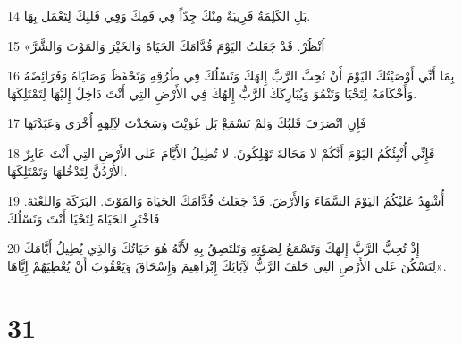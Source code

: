 \par 14 بَلِ الكَلِمَةُ قَرِيبَةٌ مِنْكَ جِدّاً فِي فَمِكَ وَفِي قَلبِكَ لِتَعْمَل بِهَا.
\par 15 «اُنْظُرْ. قَدْ جَعَلتُ اليَوْمَ قُدَّامَكَ الحَيَاةَ وَالخَيْرَ وَالمَوْتَ وَالشَّرَّ
\par 16 بِمَا أَنِّي أَوْصَيْتُكَ اليَوْمَ أَنْ تُحِبَّ الرَّبَّ إِلهَكَ وَتَسْلُكَ فِي طُرُقِهِ وَتَحْفَظَ وَصَايَاهُ وَفَرَائِضَهُ وَأَحْكَامَهُ لِتَحْيَا وَتَنْمُوَ وَيُبَارِكَكَ الرَّبُّ إِلهُكَ فِي الأَرْضِ التِي أَنْتَ دَاخِلٌ إِليْهَا لِتَمْتَلِكَهَا.
\par 17 فَإِنِ انْصَرَفَ قَلبُكَ وَلمْ تَسْمَعْ بَل غَوَيْتَ وَسَجَدْتَ لآِلِهَةٍ أُخْرَى وَعَبَدْتَهَا
\par 18 فَإِنِّي أُنْبِئُكُمُ اليَوْمَ أَنَّكُمْ لا مَحَالةَ تَهْلِكُونَ. لا تُطِيلُ الأَيَّامَ عَلى الأَرْضِ التِي أَنْتَ عَابِرٌ الأُرْدُنَّ لِتَدْخُلهَا وَتَمْتَلِكَهَا.
\par 19 أُشْهِدُ عَليْكُمُ اليَوْمَ السَّمَاءَ وَالأَرْضَ. قَدْ جَعَلتُ قُدَّامَكَ الحَيَاةَ وَالمَوْتَ. البَرَكَةَ وَاللعْنَةَ. فَاخْتَرِ الحَيَاةَ لِتَحْيَا أَنْتَ وَنَسْلُكَ
\par 20 إِذْ تُحِبُّ الرَّبَّ إِلهَكَ وَتَسْمَعُ لِصَوْتِهِ وَتَلتَصِقُ بِهِ لأَنَّهُ هُوَ حَيَاتُكَ وَالذِي يُطِيلُ أَيَّامَكَ لِتَسْكُنَ عَلى الأَرْضِ التِي حَلفَ الرَّبُّ لآِبَائِكَ إِبْرَاهِيمَ وَإِسْحَاقَ وَيَعْقُوبَ أَنْ يُعْطِيَهُمْ إِيَّاهَا».

\chapter{31}

